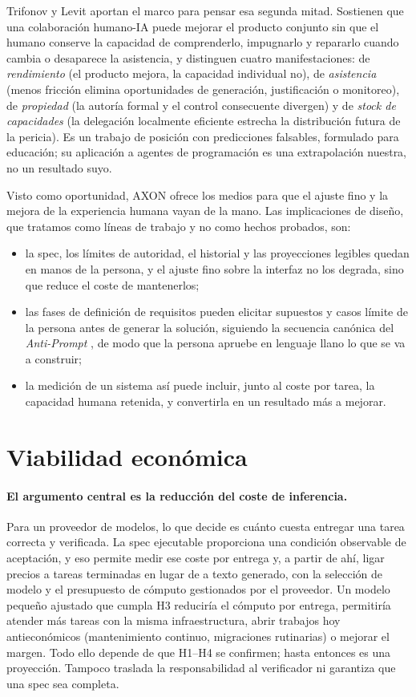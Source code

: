 \documentclass[11pt, a4paper]{article}
\begin{document}
Trifonov y Levit \cite{trifonov2026} aportan el marco para pensar esa segunda mitad. Sostienen que una colaboración humano-IA puede mejorar el producto conjunto sin que el humano conserve la capacidad de comprenderlo, impugnarlo y repararlo cuando cambia o desaparece la asistencia, y distinguen cuatro manifestaciones: de \emph{rendimiento} (el producto mejora, la capacidad individual no), de \emph{asistencia} (menos fricción elimina oportunidades de generación, justificación o monitoreo), de \emph{propiedad} (la autoría formal y el control consecuente divergen) y de \emph{stock de capacidades} (la delegación localmente eficiente estrecha la distribución futura de la pericia). Es un trabajo de posición con predicciones falsables, formulado para educación; su aplicación a agentes de programación es una extrapolación nuestra, no un resultado suyo.

Visto como oportunidad, AXON ofrece los medios para que el ajuste fino y la mejora de la experiencia humana vayan de la mano. Las implicaciones de diseño, que tratamos como líneas de trabajo y no como hechos probados, son:
\begin{itemize}[nosep]
  \item la spec, los límites de autoridad, el historial y las proyecciones legibles quedan en manos de la persona, y el ajuste fino sobre la interfaz no los degrada, sino que reduce el coste de mantenerlos;
  \item las fases de definición de requisitos pueden elicitar supuestos y casos límite de la persona antes de generar la solución, siguiendo la secuencia canónica del \emph{Anti-Prompt} \cite{trifonov2026}, de modo que la persona apruebe en lenguaje llano lo que se va a construir;
  \item la medición de un sistema así puede incluir, junto al coste por tarea, la capacidad humana retenida, y convertirla en un resultado más a mejorar.
\end{itemize}

\section{Viabilidad económica}

\paragraph{El argumento central es la reducción del coste de inferencia.} Para un proveedor de modelos, lo que decide es cuánto cuesta entregar una tarea correcta y verificada. La spec ejecutable proporciona una condición observable de aceptación, y eso permite medir ese coste por entrega y, a partir de ahí, ligar precios a tareas terminadas en lugar de a texto generado, con la selección de modelo y el presupuesto de cómputo gestionados por el proveedor. Un modelo pequeño ajustado que cumpla H3 reduciría el cómputo por entrega, permitiría atender más tareas con la misma infraestructura, abrir trabajos hoy antieconómicos (mantenimiento continuo, migraciones rutinarias) o mejorar el margen. Todo ello depende de que H1--H4 se confirmen; hasta entonces es una proyección. Tampoco traslada la responsabilidad al verificador ni garantiza que una spec sea completa.
\end{document}
